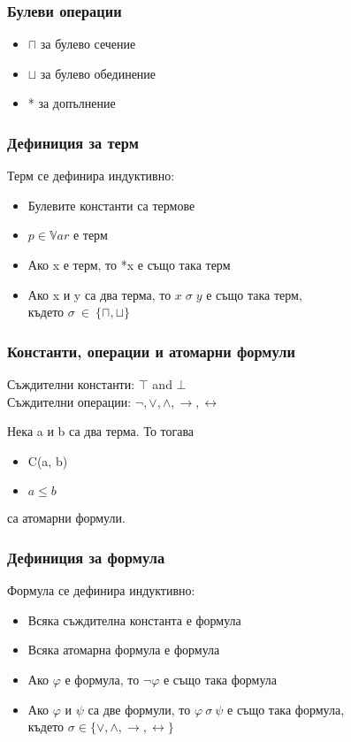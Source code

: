 \documentclass{beamer}
\begin{document}
\begin{frame}\frametitle{Булеви операции}
	\begin{itemize}
		\item $\sqcap$ за булево сечение
		\item $\sqcup$ за булево обединение
		\item * за допълнение
	\end{itemize}
\end{frame}

\begin{frame}\frametitle{Дефиниция за терм}
Терм се дефинира индуктивно:
	\begin{itemize}
		\item Булевите константи са термове
		\item $p \in \mathbb{V}ar$ е терм
		\item Ако x е терм, то *x е също така терм
		\item Ако x и y са два терма, то $x \; \sigma \; y $ е също така терм,\\
				където $\sigma \: \in \: \{\sqcap, \sqcup\}$
	\end{itemize}
\end{frame}

\begin{frame}\frametitle{Константи, операции и атомарни формули}
	Съждителни константи: $\top$ and $\bot$ \\
	\vspace{10px}
	Съждителни операции: $\neg, \vee, \wedge, \rightarrow, \leftrightarrow$
	\vspace{10px}

	Нека a и b са два терма. То тогава 
	\begin{itemize}
		\item C(a, b)
		\item $a \le b$
	\end{itemize}
	са атомарни формули.
\end{frame}

\begin{frame}\frametitle{Дефиниция за формула}
Формула се дефинира индуктивно:
		\begin{itemize}
			\item Всяка съждителна константа е формула
			\item Всяка атомарна формула е формула
			\item Ако $\varphi$ е формула, то $\neg{\varphi}$ е също така формула
			\item Ако $\varphi$ и $\psi$ са две формули, то $\varphi \: \sigma \: \psi $ е също така формула,\\
				където $\sigma \in \{\vee, \wedge, \rightarrow, \leftrightarrow\}$
		\end{itemize}
\end{frame}
\end{document}
